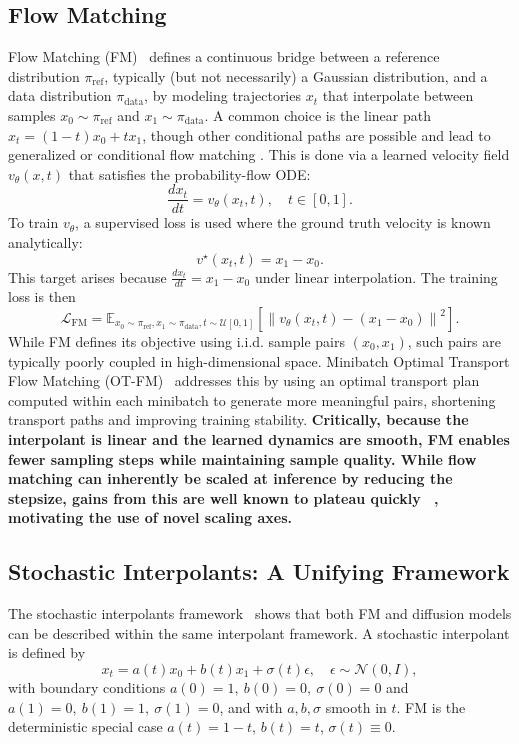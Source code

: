 \documentclass{article} %
\begin{document}
\subsection{Flow Matching}

Flow Matching (FM)~\cite{lipman2023fm} defines a continuous bridge between a reference distribution \(\pi_{\mathrm{ref}}\), typically (but not necessarily) a Gaussian distribution, and a data distribution \(\pi_{\mathrm{data}}\), by modeling trajectories \(x_t\) that interpolate between samples \(x_0 \sim \pi_{\mathrm{ref}}\) and \(x_1 \sim \pi_{\mathrm{data}}\). A common choice is the linear path $x_t = (1-t)x_0 + tx_1$, though other conditional paths are possible and lead to generalized or conditional flow matching \cite{tong2024otfm, song2021score, albergo2023stochastic_interpolants}. This is done via a learned velocity field \(v_\theta(x, t)\) that satisfies the probability-flow ODE:
\[
\frac{dx_t}{dt} = v_\theta(x_t, t), \quad t \in [0,1].
\]
To train \(v_\theta\), a supervised loss is used where the ground truth velocity is known analytically:
\[
v^\star(x_t, t) = x_1 - x_0.
\]
This target arises because \(\frac{dx_t}{dt} = x_1 - x_0\) under linear interpolation. The training loss is then
\[
\mathcal{L}_{\mathrm{FM}} = \mathbb{E}_{x_0 \sim \pi_{\mathrm{ref}}, x_1 \sim \pi_{\mathrm{data}}, t \sim \mathcal{U}[0,1]} \left[ \left\| v_\theta(x_t, t) - (x_1 - x_0) \right\|^2 \right].
\]
While FM defines its objective using i.i.d. sample pairs \((x_0, x_1)\), such pairs are typically poorly coupled in high-dimensional space. Minibatch Optimal Transport Flow Matching (OT-FM)~\cite{tong2024otfm} addresses this by using an optimal transport plan computed within each minibatch to generate more meaningful pairs, shortening transport paths and improving training stability. \textbf{Critically, because the interpolant is linear and the learned dynamics are smooth, FM enables fewer sampling steps while maintaining sample quality. While flow matching can inherently be scaled at inference by reducing the stepsize, gains from this are well known to plateau quickly ~\cite{lipman2023fm}, motivating the use of novel scaling axes.}

\subsection{Stochastic Interpolants: A Unifying Framework}

The stochastic interpolants framework~\cite{albergo2023stochastic_interpolants, ma2024sit} shows that both FM and diffusion models can be described within the same interpolant framework. A stochastic interpolant is defined by
\[
x_t = a(t) x_0 + b(t) x_1 + \sigma(t) \epsilon, \quad \epsilon \sim \mathcal{N}(0, I),
\]
with boundary conditions $a(0)=1,\ b(0)=0,\ \sigma(0)=0$ and $a(1)=0,\ b(1)=1,\ \sigma(1)=0$,
and with $a,b,\sigma$ smooth in $t$. FM is the deterministic special case $a(t)=1-t$, $b(t)=t$, $\sigma(t)\equiv 0$.
\end{document}
